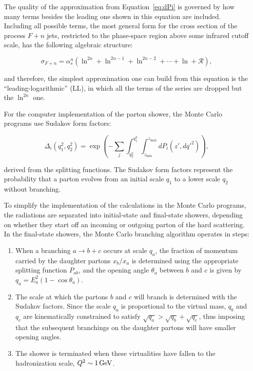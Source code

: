 The quality of the approximation from Equation~\ref{eq:dPi} is governed by how many terms besides the leading one shown in this equation are included.
Including all possible terms, the most general form for the cross section of the process $F + n$ jets, restricted to the phase-space region above some infrared cutoff scale, has the following algebraic structure:

\begin{equation}
\sigma_{F+n} = \alpha_s^n (\ln^{2n} + \ln^{2n-1} + \ln^{2n-2} + \cdots + \ln + \mathcal{R}),
\label{leadinglogapproximation}
\end{equation}

\noindent and therefore, the simplest approximation one can build from this equation is the ``leading-logarithmic'' (LL), in which all the terms of the series are dropped but the $\ln^{2n}$ one.

For the computer implementation of the parton shower, the Monte Carlo programs use Sudakov form factors:

\begin{equation}
\Delta_i(q_1^2, q_2^2) = \exp{\left( - \sum_{j} \int_{q_2^2}^{q_1^2}{\,\int_{z_\text{min}}^{z_\text{max}}{dP_i(z',dq'^2)}} \right)},
\label{eq:Sudakov}
\end{equation}

\noindent derived from the splitting functions.
The Sudakov form factors represent the probability that a parton evolves from an initial scale $q_1$ to a lower scale $q_2$ without branching.

To simplify the implementation of the calculations in the Monte Carlo programs, the radiations are separated into initial-state and final-state showers, depending on whether they start off an incoming or outgoing parton of the hard scattering.
In the final-state showers, the Monte Carlo branching algorithm operates in steps:

\begin{enumerate}
\item When a branching $a\rightarrow b + c$ occurs at scale $q_a$, the fraction of momentum carried by the daughter partons $x_b/x_a$ is determined using the appropriate splitting function $P_{ab}$, and the opening angle $\theta_a$ between $b$ and $c$ is given by $q_a = E_a^2(1-\cos{\theta_a})$.

\item The scale at which the partons $b$ and $c$ will branch is determined with the Sudakov factors.
Since the scale $q_a$ is proportional to the virtual mass, $q_b$ and $q_c$ are kinematically constrained to satisfy $\sqrt{q_a} > \sqrt{q_b} + \sqrt{q_c}$, thus imposing that the subsequent branchings on the daughter partons will have smaller opening angles.

\item The shower is terminated when these virtualities have fallen to the hadronization scale, $Q^2\sim\unit[1]{GeV}$.
\end{enumerate}

